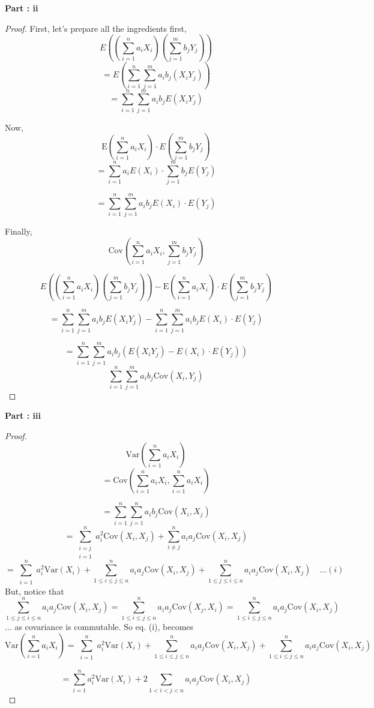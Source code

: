 \documentclass{article}
\theoremstyle{definition}
\begin{document}
\textbf{Part : ii}
\begin{proof}
    First, let's prepare all the ingredients first,
    \[
    E((\sum_{i=1}^n a_iX_i)( \sum_{j=1}^m  b_jY_j))
    \]
    \[
    = E(\sum_{i=1}^n \sum_{j=1}^m a_i b_j (X_i Y_j))
    \]
    \[
    = \sum_{i=1}^n \sum_{j=1}^m a_i b_j E(X_i Y_j)
    \]
    
    Now,
    \[
    \text{E} ( \sum_{i=1}^n a_i X_i)\cdot  E( \sum_{j=1}^m b_j Y_j)
    \]
    \[
    =     \sum_{i=1}^n a_i E(X_i)\cdot   \sum_{j=1}^m b_j E(Y_j)
    \]

    \[
        = \sum_{i=1}^n \sum_{j=1}^m a_i b_j E(X_i) \cdot E( Y_j)
    \]


    Finally,
    \[
    \text{Cov} \left( \sum_{i=1}^n a_i X_i, \sum_{j=1}^m b_j Y_j \right)
    \]
    
    \[
     E((\sum_{i=1}^n a_iX_i)( \sum_{j=1}^m  b_jY_j)) -     \text{E} ( \sum_{i=1}^n a_i X_i)\cdot  E( \sum_{j=1}^m b_j Y_j)

    \]

\[
    = \sum_{i=1}^n \sum_{j=1}^m a_i b_j E(X_i Y_j) -     
        \sum_{i=1}^n \sum_{j=1}^m a_i b_j E(X_i) \cdot E( Y_j)
    

\]

    \[
        = \sum_{i=1}^n \sum_{j=1}^m a_i b_j (E(X_i Y_j) - E(X_i) \cdot E( Y_j))

    \]
    \[
    \sum_{i=1}^n \sum_{j=1}^m a_i b_j \text{Cov}(X_i, Y_j)
    \]
\end{proof}
\textbf{Part : iii}
\begin{proof}


\[
\text{Var} \left( \sum_{i=1}^n a_i X_i \right) 
\] 
\[
= \text{Cov} \left( \sum_{i=1}^n a_i X_i, \sum_{i=1}^n a_i X_i \right)
\]

\[
= \sum_{i=1}^n \sum_{j=1}^n a_i b_j \text{Cov}(X_i, X_j)
\]
\[
= \sum_{\substack{i=j \\ i =1}}^n a_i^2 \text{Cov}(X_i, X_j) + \sum_{i \neq j}^n a_ia_j \text{Cov} (X_i,X_j)
\]
\[
= \sum_{\substack{i=1}}^n a_i^2 \text{Var}(X_i) + \sum_{1 \leq i \leq j \leq n}^n a_ia_j \text{Cov} (X_i,X_j) +  \sum_{1 \leq j \leq i \leq n}^n a_ia_j \text{Cov} (X_i,X_j) \quad \dots (i)
\]
But, notice that 
\[
\sum_{1 \leq j \leq i \leq n}^n a_ia_j \text{Cov} (X_i,X_j) = \sum_{1 \leq i \leq j \leq n}^n a_ia_j \text{Cov} (X_j,X_i) = \sum_{1 \leq i \leq j \leq n}^n a_ia_j \text{Cov} (X_i,X_j)
\]
$\dots$ as covariance is commutable. So eq. (i), becomes
\[
\text{Var} \left( \sum_{i=1}^n a_i X_i \right) = \sum_{\substack{i=1}}^n a_i^2 \text{Var}(X_i) + \sum_{1 \leq i \leq j \leq n}^n a_ia_j \text{Cov} (X_i,X_j) + \sum_{1 \leq i \leq j \leq n}^n a_ia_j \text{Cov} (X_i,X_j)
\]


\[
= \sum_{i=1}^n a_i^2 \text{Var}(X_i) + 2 \sum_{1 < i < j < n} a_ia_j\text{Cov}(X_i, X_j)
\]
    
\end{proof}
\end{document}
